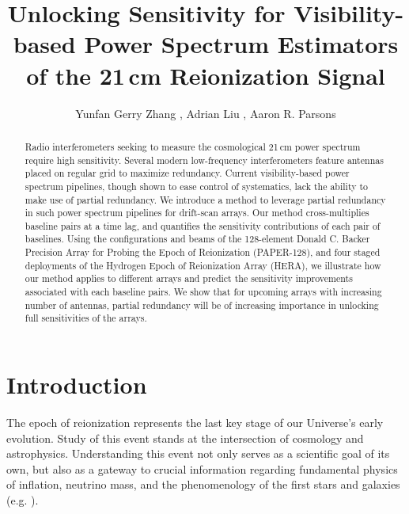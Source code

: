 \documentclass[twocolumn,apj,numberedappendix]{emulateapj}
\renewcommand\[{\begin{equation}}
\renewcommand\]{\end{equation}}
\begin{document}
\title{Unlocking Sensitivity for Visibility-based Power Spectrum Estimators of the 21\,cm Reionization Signal}

\author{
Yunfan Gerry Zhang ,
Adrian Liu ,
Aaron R. Parsons
}


\begin{abstract}
Radio interferometers seeking to measure the cosmological 21\,cm power spectrum require high sensitivity. Several modern low-frequency interferometers feature antennas placed on regular grid to maximize redundancy. Current visibility-based power spectrum pipelines, though shown to ease control of systematics, lack the ability to make use of partial redundancy. We introduce a method to leverage partial redundancy in such power spectrum pipelines for drift-scan arrays. Our method cross-multiplies baseline pairs at a time lag, and quantifies the sensitivity contributions of each pair of baselines. 
Using the configurations and beams of the 128-element Donald C. Backer Precision Array for Probing the Epoch of Reionization (PAPER-128), and four staged deployments of the Hydrogen Epoch of Reionization Array (HERA), we illustrate how our method applies to different arrays and predict the sensitivity improvements associated with each baseline pairs. We show that for upcoming arrays with increasing number of antennas, partial redundancy will be of increasing importance in unlocking full sensitivities of the arrays. 
\end{abstract}

\section{Introduction}

The epoch of reionization represents the last key
stage of our Universe's early evolution. Study of this event stands at
the intersection of cosmology and astrophysics. Understanding this
event not only serves as a scientific goal
of its own, but also as a gateway to crucial information
regarding fundamental physics of inflation, neutrino mass, and the phenomenology
of the first stars and galaxies (e.g. \citealt{LiuOpticalDepth, Liu2016b, Mao2008, DEw21cm, Bull2015, Oyama20131186}). 
\end{document}
